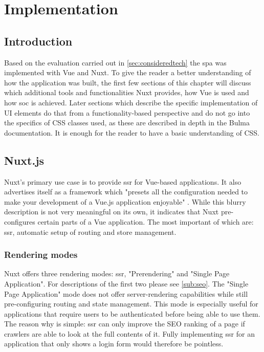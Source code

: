 \chapter[Implementation]{Implementation} \label{ch:implementation}

\section{Introduction}
Based on the evaluation carried out in \autoref{sec:consideredtech} the \acrlong{spa} was implemented with Vue and Nuxt. To give the reader a better understanding of how the application was built, the first few sections of this chapter will discuss which additional tools and functionalities Nuxt provides, how Vue is used and how \acrfull{soc} is achieved. Later sections which describe the specific implementation of UI elements do that from a functionality-based perspective and do not go into the specifics of CSS classes used, as these are described in depth in the Bulma documentation. It is enough for the reader to have a basic understanding of CSS.

\section{Nuxt.js}
Nuxt's primary use case is to provide \acrlong{ssr} for Vue-based applications. It also advertises itself as a framework which "presets all the configuration needed to make your development of a Vue.js application enjoyable" \cite{Nuxtjs:online}. While this blurry description is not very meaningful on its own, it indicates that Nuxt pre-configures certain parts of a Vue application. The most important of which are: \acrlong{ssr}, automatic setup of routing and store management.

\subsection{Rendering modes}
Nuxt offers three rendering modes: \acrshort{ssr}, "Prerendering" and "Single Page Application". For descriptions of the first two please see \autoref{sub:seo}. The "Single Page Application" mode does not offer server-rendering capabilities while still pre-configuring routing and state management. This mode is especially useful for applications that require users to be authenticated before being able to use them. The reason why is simple: \acrlong{ssr} can only improve the SEO ranking of a page if crawlers are able to look at the full contents of it. Fully implementing \acrshort{ssr} for an application that only shows a login form would therefore be pointless. 

